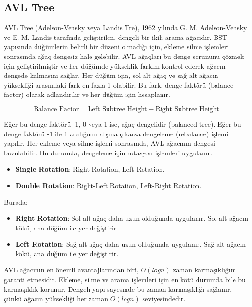 \newpage

\subsection{AVL Tree}

AVL Tree (Adelson-Vensky veya Landis Tre), 1962 yılında G. M. Adelson-Vensky ve E. M. Landis tarafında geliştirilen, dengeli bir ikili arama ağacıdır. BST yapısında düğümlerin belirli bir düzeni olmadığı için, ekleme silme işlemleri sonrasında ağaç dengesiz hale gelebilir. AVL ağaçları bu denge sorununu çözmek için geliştirilmiştir ve her düğümde yükseklik farkını kontrol ederek ağacın dengede kalmasını sağlar. Her düğüm için, sol alt ağaç ve sağ alt ağacın yüksekliği arasındaki fark en fazla 1 olabilir. Bu fark, denge faktörü (balance factor) olarak adlandırılır ve her düğüm için hesaplanır.

\[ \text{Balance Factor} = \text{Left Subtree Height} - \text{Right Subtree Height} \]

Eğer bu denge faktörü -1, 0 veya 1 ise, ağaç dengelidir (balanced tree). Eğer bu denge faktörü -1 ile 1 aralığının dışına çıkarsa dengeleme (rebalance) işlemi yapılır. Her ekleme veya silme işlemi sonrasında, AVL ağacının dengesi bozulabilir. Bu durumda, dengeleme için rotasyon işlemleri uygulanır:

\begin{itemize}
    \item \textbf{Single Rotation}: Right Rotation, Left Rotation.
    \item \textbf{Double Rotation}: Right-Left Rotation, Left-Right Rotation.
\end{itemize}

Burada:

\begin{itemize}
    \item \textbf{Right Rotation}: Sol alt ağaç daha uzun olduğunda uygulanır. Sol alt ağacın kökü, ana düğüm ile yer değiştirir.
    \item \textbf{Left Rotation}: Sağ alt ağaç daha uzun olduğunda uygulanır. Sağ alt ağacın kökü, ana düğüm ile yer değiştirir.
\end{itemize}

AVL ağacının en önemli avantajlarından biri, $O(logn)$ zaman karmaşıklığını garanti etmesidir. Ekleme, silme ve arama işlemleri için en kötü durumda bile bu karmaşıklık korunur. Dengeli yapı sayesinde bu zaman karmaşıklığı sağlanır, çünkü ağacın yüksekliği her zaman $O(logn)$ seviyesindedir.

